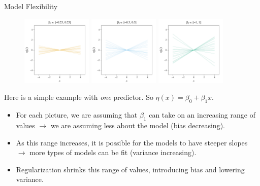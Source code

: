 \documentclass[8pt]{beamer}
\begin{document}
\begin{frame}{Model Flexibility}

\begin{figure}
    \centering
    \includegraphics[width = 0.3\textwidth]{b1.pdf}
    \includegraphics[width = 0.3\textwidth]{b2.pdf}
    \includegraphics[width = 0.3\textwidth]{b3.pdf}
\end{figure}

Here is a simple example with \textit{one} predictor. So $\eta(x) = \beta_0 + \beta_1 x$.
\begin{itemize}
    \item For each picture, we are assuming that $\beta_1$ can take on an increasing range of values $\to$ we are assuming less about the model (bias decreasing).
    \item As this range increases, it is possible for the models to have steeper slopes $\to$ more types of models can be fit (variance increasing).
    \item Regularization shrinks this range of values, introducing bias and lowering variance.
\end{itemize}
    
\end{frame}
\end{document}
